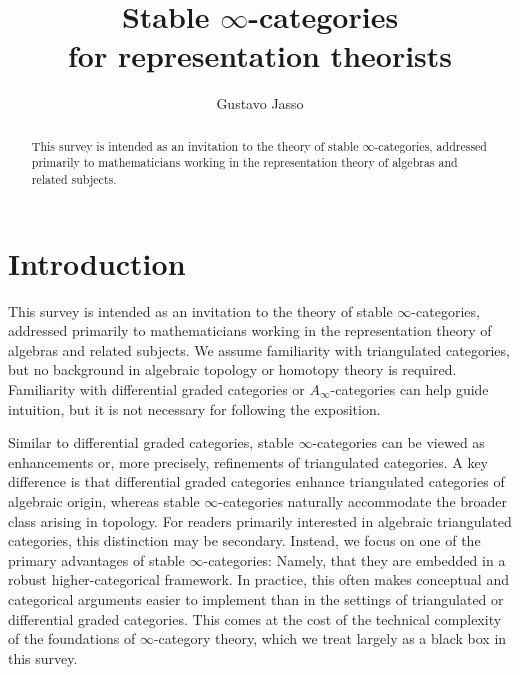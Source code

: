\documentclass[a4paper]{amsart}
\begin{document}
\title%
[Stable $\infty$-categories for representation theorists]%
{Stable $\infty$-categories\\ for representation theorists}%

\author[G.~Jasso]{Gustavo Jasso}%

\address{%
  Mathematisches Institut, %
  Universität zu Köln, %
  Weyertal 86-90, %
  50931 Köln, %
  Germany}%

%
%

%

%

\begin{abstract}
This survey is intended as an invitation to the theory of stable $\infty$-categories, addressed
primarily to mathematicians working in the representation theory of algebras and
related subjects.


\end{abstract}

\maketitle

\tableofcontents

\section*{Introduction}

This survey is intended as an invitation to the theory of stable
$\infty$-categories, addressed primarily to mathematicians working in the
representation theory of algebras and related subjects. We assume familiarity
with triangulated categories, but no background in algebraic topology or
homotopy theory is required. Familiarity with differential graded categories or
$A_\infty$-categories can help guide intuition, but it is not necessary for
following the exposition.

Similar to differential graded categories, stable $\infty$-categories can be
viewed as enhancements or, more precisely, refinements of triangulated
categories. A key difference is that differential graded categories enhance
triangulated categories of algebraic origin, whereas stable $\infty$-categories
naturally accommodate the broader class arising in topology. For readers
primarily interested in algebraic triangulated categories, this distinction may
be secondary. Instead, we focus on one of the primary advantages of stable
$\infty$-categories: Namely, that they are embedded in a robust
higher-categorical framework. In practice, this often makes conceptual and
categorical arguments easier to implement than in the settings of triangulated
or differential graded categories. This comes at the cost of the technical
complexity of the foundations of $\infty$-category theory, which we treat
largely as a black box in this survey.
\end{document}
